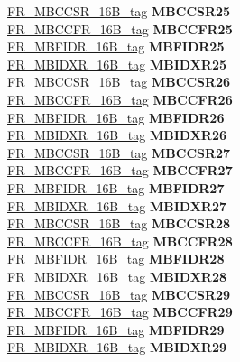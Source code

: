 \begin{DoxyCompactItemize}
\begin{tabbing}
\>\>\mbox{\hyperlink{unionFR__MBCCSR__16B__tag}{FR\_MBCCSR\_16B\_tag}} {\bfseries MBCCSR25}\\
\>\>\mbox{\hyperlink{unionFR__MBCCFR__16B__tag}{FR\_MBCCFR\_16B\_tag}} {\bfseries MBCCFR25}\\
\>\>\mbox{\hyperlink{unionFR__MBFIDR__16B__tag}{FR\_MBFIDR\_16B\_tag}} {\bfseries MBFIDR25}\\
\>\>\mbox{\hyperlink{unionFR__MBIDXR__16B__tag}{FR\_MBIDXR\_16B\_tag}} {\bfseries MBIDXR25}\\
\>\>\mbox{\hyperlink{unionFR__MBCCSR__16B__tag}{FR\_MBCCSR\_16B\_tag}} {\bfseries MBCCSR26}\\
\>\>\mbox{\hyperlink{unionFR__MBCCFR__16B__tag}{FR\_MBCCFR\_16B\_tag}} {\bfseries MBCCFR26}\\
\>\>\mbox{\hyperlink{unionFR__MBFIDR__16B__tag}{FR\_MBFIDR\_16B\_tag}} {\bfseries MBFIDR26}\\
\>\>\mbox{\hyperlink{unionFR__MBIDXR__16B__tag}{FR\_MBIDXR\_16B\_tag}} {\bfseries MBIDXR26}\\
\>\>\mbox{\hyperlink{unionFR__MBCCSR__16B__tag}{FR\_MBCCSR\_16B\_tag}} {\bfseries MBCCSR27}\\
\>\>\mbox{\hyperlink{unionFR__MBCCFR__16B__tag}{FR\_MBCCFR\_16B\_tag}} {\bfseries MBCCFR27}\\
\>\>\mbox{\hyperlink{unionFR__MBFIDR__16B__tag}{FR\_MBFIDR\_16B\_tag}} {\bfseries MBFIDR27}\\
\>\>\mbox{\hyperlink{unionFR__MBIDXR__16B__tag}{FR\_MBIDXR\_16B\_tag}} {\bfseries MBIDXR27}\\
\>\>\mbox{\hyperlink{unionFR__MBCCSR__16B__tag}{FR\_MBCCSR\_16B\_tag}} {\bfseries MBCCSR28}\\
\>\>\mbox{\hyperlink{unionFR__MBCCFR__16B__tag}{FR\_MBCCFR\_16B\_tag}} {\bfseries MBCCFR28}\\
\>\>\mbox{\hyperlink{unionFR__MBFIDR__16B__tag}{FR\_MBFIDR\_16B\_tag}} {\bfseries MBFIDR28}\\
\>\>\mbox{\hyperlink{unionFR__MBIDXR__16B__tag}{FR\_MBIDXR\_16B\_tag}} {\bfseries MBIDXR28}\\
\>\>\mbox{\hyperlink{unionFR__MBCCSR__16B__tag}{FR\_MBCCSR\_16B\_tag}} {\bfseries MBCCSR29}\\
\>\>\mbox{\hyperlink{unionFR__MBCCFR__16B__tag}{FR\_MBCCFR\_16B\_tag}} {\bfseries MBCCFR29}\\
\>\>\mbox{\hyperlink{unionFR__MBFIDR__16B__tag}{FR\_MBFIDR\_16B\_tag}} {\bfseries MBFIDR29}\\
\>\>\mbox{\hyperlink{unionFR__MBIDXR__16B__tag}{FR\_MBIDXR\_16B\_tag}} {\bfseries MBIDXR29}\\

\end{tabbing}
\end{DoxyCompactItemize}
